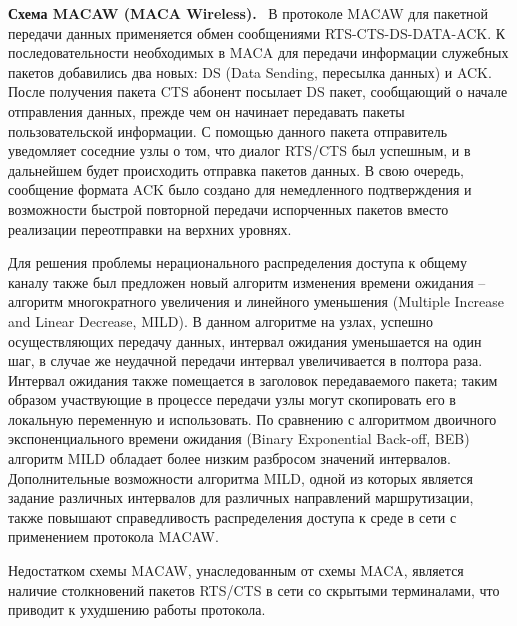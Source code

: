 \documentclass[14pt,a4paper,titlepage]{extarticle}
\renewcommand{\paragraph}[1]{\textbf{#1.}~}
\begin{document}
\paragraph{Схема MACAW (MACA Wireless)}
В протоколе MACAW для пакетной передачи данных применяется обмен сообщениями RTS-CTS-DS-DATA-ACK. К последовательности необходимых в MACA для передачи информации служебных пакетов добавились два новых: DS (Data Sending, пересылка данных) и ACK. После получения пакета CTS абонент посылает DS пакет, сообщающий о начале отправления данных, прежде чем он начинает передавать пакеты пользовательской информации. С помощью данного пакета отправитель уведомляет соседние узлы о том, что диалог RTS/CTS был успешным, и в дальнейшем будет происходить отправка пакетов данных. В свою очередь, сообщение формата ACK было создано для немедленного подтверждения и возможности быстрой повторной передачи испорченных пакетов вместо реализации переотправки на верхних уровнях. 

Для решения проблемы нерационального распределения доступа к общему каналу также был предложен новый алгоритм изменения времени ожидания -- алгоритм многократного увеличения и линейного уменьшения (Multiple Increase and Linear Decrease, MILD). В данном алгоритме на узлах, успешно осуществляющих передачу данных, интервал ожидания уменьшается на один шаг, в случае же неудачной передачи интервал увеличивается в полтора раза. Интервал ожидания также помещается в заголовок передаваемого пакета; таким образом участвующие в процессе передачи узлы могут скопировать его в локальную переменную и использовать. По сравнению с алгоритмом двоичного экспоненциального времени ожидания (Binary Exponential Back-off, BEB) алгоритм MILD обладает более низким разбросом значений интервалов. Дополнительные возможности алгоритма MILD, одной из которых является задание различных интервалов для различных направлений маршрутизации, также повышают справедливость распределения доступа к среде в сети с применением протокола MACAW. 

Недостатком схемы MACAW, унаследованным от схемы MACA, является наличие столкновений пакетов RTS/CTS в сети со скрытыми терминалами, что приводит к ухудшению работы протокола.
\end{document}
